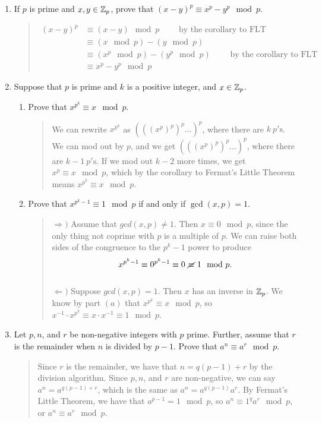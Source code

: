 \documentclass{hw}
\begin{document}

\begin{enumerate}
\item If $p$ is prime and $x,y\in\mathbb{Z}_{p}$, prove that $(x-y)^{p}\equiv x^{p}-y^{p}\mod p$.
\begin{quote}
\begin{align*}
(x-y)^{p} &\equiv (x-y)\mod p \qquad\text{ by the corollary to FLT}\\
&\equiv (x\mod p) - (y\mod p)\\
&\equiv (x^{p}\mod p) - (y^{p}\mod p)\qquad\text{ by the corollary to FLT}\\
&\equiv x^{p} - y^{p} \mod p
\end{align*}
\end{quote}

\item Suppose that $p$ is prime and $k$ is a positive integer, and $x\in\mathbb{Z}_{p}$.
\begin{enumerate}
\item Prove that $x^{p^{k}}\equiv x\mod p$.
\begin{quote}
We can rewrite $x^{p^{k}}$ as $(((x^{p})^{p})^{p}...)^{p}$, where there are $k\ p'\text{s}$. We
can mod out by $p$, and we get $(((x^{p})^{p})^{p}...)^{p}$, where there are $k-1\ p'\text{s}$. If
we mod out $k-2$ more times, we get $x^{p}\equiv x\mod p$, which by the corollary to Fermat's
Little Theorem means $x^{p^{k}}\equiv x\mod p$.
\end{quote}
\item Prove that $x^{p^{k}-1}\equiv 1\mod p$ if and only if $\gcd{(x,p)}=1$.
\begin{quote}
$\Rightarrow)$ Assume that $gcd(x,p)\neq1$. Then $x\equiv0\mod p$, since the only thing not coprime
with $p$ is a multiple of $p$. We can raise both sides of the congruence to the ${p^{k}-1}$
power to produce
\[
x^{p^{k}-1}\equiv 0^{p^{k}-1} \equiv 0 \ \cancel{\equiv}\ 1 \mod p.
\]
\noindent\\
$\Leftarrow)$ Suppose $gcd(x,p)=1$. Then $x$ has an inverse in $\mathbb{Z}_{p}$. We know by part $(a)$
that $x^{p^{k}}\equiv x\mod p$, so $x^{-1}\cdot x^{p^{k}}\equiv x\cdot x^{-1}\equiv 1\mod p$.
\end{quote}
\end{enumerate}

\item Let $p,n$, and $r$ be non-negative integers with $p$ prime. Further, assume that $r$ is the
remainder when $n$ is divided by $p-1$. Prove that $a^{n}\equiv a^{r}\mod p$.
\begin{quote}
Since $r$ is the remainder, we have that $n = q(p-1)+r$ by the division algorithm. Since
$p,n$, and $r$ are non-negative, we can say $a^{n}=a^{q(p-1) + r}$, which is the same as
$a^{n}=a^{q(p-1)}a^{r}$. By Fermat's Little Theorem, we have that $a^{p-1}=1\mod p$, so
$a^{n}\equiv 1^{q}a^{r}\mod p$, or $a^{n}\equiv a^{r}\mod p$.
\end{quote}


\end{enumerate}
\end{document}
